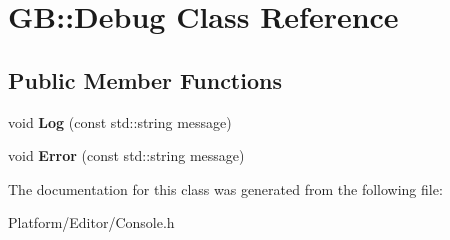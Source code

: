 \hypertarget{class_g_b_1_1_debug}{}\section{GB\+::Debug Class Reference}
\label{class_g_b_1_1_debug}
\subsection*{Public Member Functions}
\begin{DoxyCompactItemize}
\item 
\mbox{\label{class_g_b_1_1_debug_ab560bbac426bba8c12f0ab253c03ea8c}} 
void {\bfseries Log} (const std\+::string message)
\item 
\mbox{\label{class_g_b_1_1_debug_ad650f5b1bd6e78f5a2031342c215de01}} 
void {\bfseries Error} (const std\+::string message)
\end{DoxyCompactItemize}


The documentation for this class was generated from the following file\+:\begin{DoxyCompactItemize}
\item 
Platform/\+Editor/Console.\+h\end{DoxyCompactItemize}
